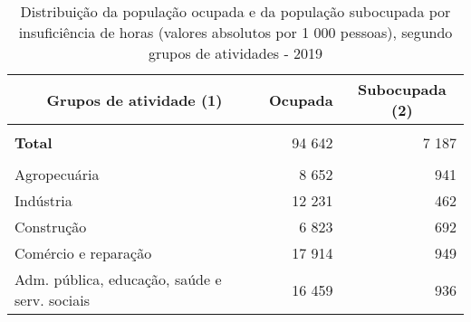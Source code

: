 \documentclass[12pt]{article}   %
\begin{document}
\begin{table}[h!]
    \centering
    \caption{Distribuição da população ocupada e da população subocupada por insuficiência de horas (valores absolutos por 1 000 pessoas), segundo grupos de atividades - 2019}
    \vspace{-0.3cm}
    \label{tab_pop_ocupada_subocupada}
    \begin{tabular}{lrr}
    \hline
    \multicolumn{1}{c|}{\textbf{Grupos de atividade (1)}}                                  & \multicolumn{1}{c}{\textbf{Ocupada}}              & \multicolumn{1}{c}{\textbf{Subocupada (2)}}              \\ \hline
    \multicolumn{1}{l|}{}                                                                  &                                                   &                                                          \\
    \multicolumn{1}{l|}{\textbf{Total}}                                                    & 94 642                                            & 7 187                                                    \\
    \multicolumn{1}{l|}{}                                                                  &                                                   &                                                          \\
    \multicolumn{1}{l|}{Agropecuária}                                                      & 8 652                                             & 941                                                      \\
    \multicolumn{1}{l|}{Indústria}                                                         & 12 231                                            & 462                                                      \\
    \multicolumn{1}{l|}{Construção}                                                        & 6 823                                             & 692                                                      \\
    \multicolumn{1}{l|}{Comércio e reparação}                                              & 17 914                                            & 949                                                      \\
    \multicolumn{1}{l|}{Adm. pública, educação, saúde e serv. sociais}                     & 16 459                                            & 936                                                      \\

\end{tabular}
\end{table}
\end{document}
